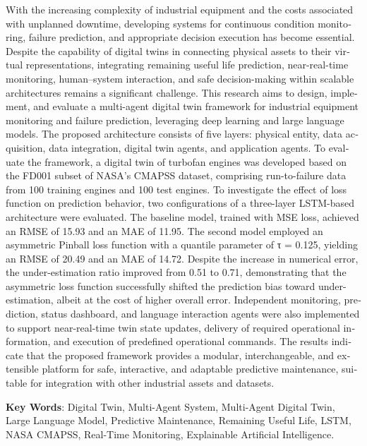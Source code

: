 \begin{latin}
\begin{small}
With the increasing complexity of industrial equipment and the costs associated with unplanned downtime, developing systems for continuous condition monitoring, failure prediction, and appropriate decision execution has become essential. Despite the capability of digital twins in connecting physical assets to their virtual representations, integrating remaining useful life prediction, near-real-time monitoring, human–system interaction, and safe decision-making within scalable architectures remains a significant challenge. This research aims to design, implement, and evaluate a multi-agent digital twin framework for industrial equipment monitoring and failure prediction, leveraging deep learning and large language models. The proposed architecture consists of five layers: physical entity, data acquisition, data integration, digital twin agents, and application agents. To evaluate the framework, a digital twin of turbofan engines was developed based on the FD001 subset of NASA’s CMAPSS dataset, comprising run-to-failure data from 100 training engines and 100 test engines. To investigate the effect of loss function on prediction behavior, two configurations of a three-layer LSTM-based architecture were evaluated. The baseline model, trained with MSE loss, achieved an RMSE of 15.93 and an MAE of 11.95. The second model employed an asymmetric Pinball loss function with a quantile parameter of τ = 0.125, yielding an RMSE of 20.49 and an MAE of 14.72. Despite the increase in numerical error, the under-estimation ratio improved from 0.51 to 0.71, demonstrating that the asymmetric loss function successfully shifted the prediction bias toward under-estimation, albeit at the cost of higher overall error. Independent monitoring, prediction, status dashboard, and language interaction agents were also implemented to support near-real-time twin state updates, delivery of required operational information, and execution of predefined operational commands. The results indicate that the proposed framework provides a modular, interchangeable, and extensible platform for safe, interactive, and adaptable predictive maintenance, suitable for integration with other industrial assets and datasets.


\end{small}

\vspace{0.5 cm}

\noindent \textbf{Key Words}: Digital Twin, Multi-Agent System, Multi-Agent Digital Twin, Large Language Model, Predictive Maintenance, Remaining Useful Life, LSTM, NASA CMAPSS, Real-Time Monitoring, Explainable Artificial Intelligence.

\end{latin}